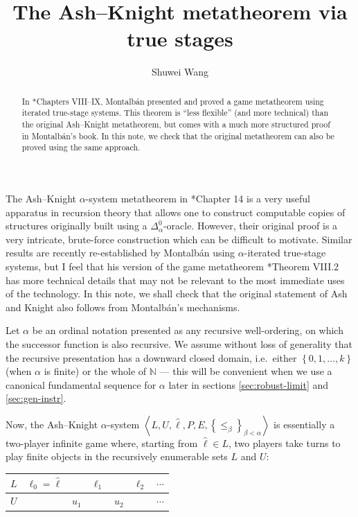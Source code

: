 \documentclass[11pt]{article}
\title{The Ash--Knight metatheorem via true stages}
\author{Shuwei Wang}
\date{\DTMdate{2026-04-14}}
\theoremstyle{plain}
\theoremstyle{definition}
\newcommand{\tuple}[1]{\left\langle #1 \right\rangle}
\begin{document}
\maketitle

\begin{abstract}
  In \cite{montalban26-computable-structure}*{Chapters VIII--IX}, Montalb\'an presented and proved a game metatheorem using iterated true-stage systems. This theorem is ``less flexible'' (and more technical) than the original Ash--Knight metatheorem, but comes with a much more structured proof in Montalb\'an's book. In this note, we check that the original metatheorem can also be proved using the same approach.
\end{abstract}

The Ash--Knight $\alpha$-system metatheorem in \cite{ash-knight00-computable-structures}*{Chapter 14} is a very useful apparatus in recursion theory that allows one to construct computable copies of structures originally built using a $\Delta^0_\alpha$-oracle. However, their original proof is a very intricate, brute-force construction which can be difficult to motivate. Similar results are recently re-established by Montalb\'an \cite{montalban26-computable-structure} using $\alpha$-iterated true-stage systems, but I feel that his version of the game metatheorem \cite{montalban26-computable-structure}*{Theorem VIII.2} has more technical details that may not be relevant to the most immediate uses of the technology. In this note, we shall check that the original statement of Ash and Knight also follows from Montalb\'an's mechanisms.

Let $\alpha$ be an ordinal notation presented as any recursive well-ordering, on which the successor function is also recursive. We assume without loss of generality that the recursive presentation has a downward closed domain, i.e.\ either $\left\{0, 1, \ldots, k\right\}$ (when $\alpha$ is finite) or the whole of $\mathbb{N}$ --- this will be convenient when we use a canonical fundamental sequence for $\alpha$ later in sections \ref{sec:robust-limit} and \ref{sec:gen-instr}.

Now, the Ash--Knight $\alpha$-system $\tuple{L, U, \hat{\ell}, P, E, \left\{\leq_\beta\right\}_{\beta < \alpha}}$ is essentially a two-player infinite game where, starting from $\hat{\ell} \in L$, two players take turns to play finite objects in the recursively enumerable sets $L$ and $U$:

\begin{center}
  \begin{tabular}{c|cccccc}
    $L$ & $\ell_0 = \hat{\ell}$ &       & $\ell_1$ &       & $\ell_2$ & $\cdots$ \\
    \hline
    $U$ &                       & $u_1$ &          & $u_2$ &          & $\cdots$
  \end{tabular}
\end{center}
\end{document}
